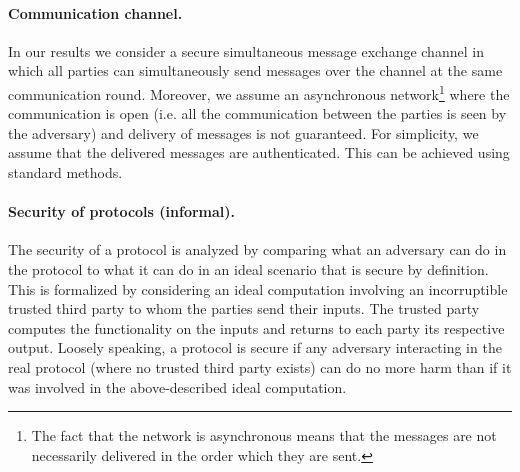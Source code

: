 \paragraph{Communication channel.} In our results we consider a secure simultaneous message exchange channel in which all parties can simultaneously send messages over the channel at the same communication round. Moreover, we assume an asynchronous network\footnote{The fact that the network is asynchronous means that the messages are not necessarily delivered in the order which
they are sent.} where the communication is open (i.e. all the communication between the parties is seen by the adversary) and delivery of messages is not guaranteed. For simplicity, we assume that the delivered messages are authenticated. This can be achieved using standard methods.



\paragraph{Security of protocols (informal).} The security of a protocol is analyzed by comparing what an
adversary can do in the protocol to what it can do in an ideal scenario that is secure by definition.
This is formalized by considering an ideal computation involving an incorruptible trusted third
party to whom the parties send their inputs. The trusted party computes the functionality on the
inputs and returns to each party its respective output. Loosely speaking, a protocol is secure if
any adversary interacting in the real protocol (where no trusted third party exists) can do no more
harm than if it was involved in the above-described ideal computation.



